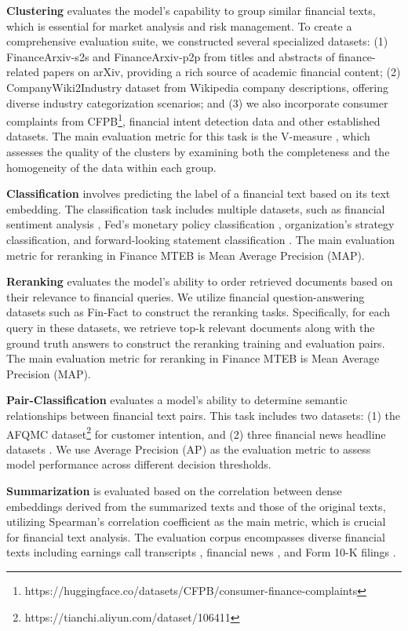 \textbf{Clustering} evaluates the model's capability to group similar financial texts, which is essential for market analysis and risk management. To create a comprehensive evaluation suite, we constructed several specialized datasets: (1) FinanceArxiv-s2s and FinanceArxiv-p2p from titles and abstracts of finance-related papers on arXiv, providing a rich source of academic financial content; (2) CompanyWiki2Industry dataset from Wikipedia company descriptions, offering diverse industry categorization scenarios; and (3) we also incorporate consumer complaints from CFPB\footnote{https://huggingface.co/datasets/CFPB/consumer-finance-complaints}, financial intent detection data \citep{Intent_Detection,Synthetic} and other established datasets. The main evaluation metric for this task is the V-measure \citep{v-Measure}, which assesses the quality of the clusters by examining both the completeness and the homogeneity of the data within each group.


\textbf{Classification} involves predicting the label of a financial text based on its text embedding. The classification task includes multiple datasets, such as financial sentiment analysis \citep{fpb,FiQA,semeval, bbt}, Fed's monetary policy classification \citep{fomc}, organization's strategy classification, and forward-looking statement classification \citep{investlm}. The main evaluation metric for reranking in Finance MTEB is Mean Average Precision (MAP).

\textbf{Reranking} evaluates the model's ability to order retrieved documents based on their relevance to financial queries. We utilize financial question-answering datasets such as Fin-Fact\citep{rangapur2023finfact} to construct the reranking tasks. Specifically, for each query in these datasets, we retrieve top-k relevant documents along with the ground truth answers to construct the reranking training and evaluation pairs. The main evaluation metric for reranking in Finance MTEB is Mean Average Precision (MAP).


\textbf{Pair-Classification} evaluates a model's ability to determine semantic relationships between financial text pairs. This task includes two datasets: (1) the AFQMC dataset\footnote{https://tianchi.aliyun.com/dataset/106411} for customer intention, and (2) three financial news headline datasets \citep{headline}. We use Average Precision (AP) as the evaluation metric to assess model performance across different decision thresholds.


\textbf{Summarization} is evaluated based on the correlation between dense embeddings derived from the summarized texts and those of the original texts, utilizing Spearman's correlation coefficient as the main metric, which is crucial for financial text analysis. The evaluation corpus encompasses diverse financial texts including earnings call transcripts \citep{ectsum}, financial news \citep{bbt}, and Form 10-K filings \citep{fns2022}.


